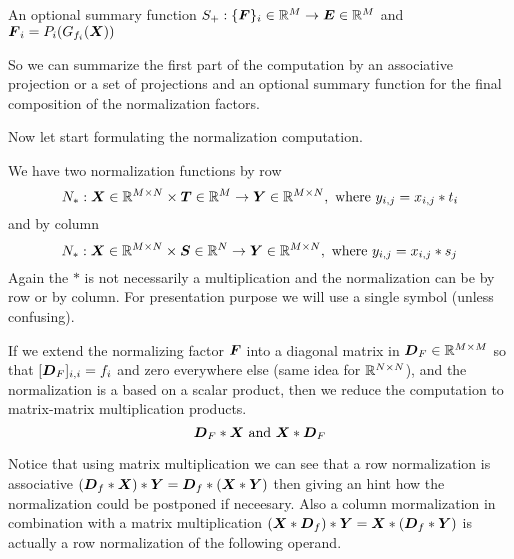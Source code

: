 \documentclass[acmsmall]{acmart}
\begin{document}
\begin{definition}
  An optional summary function $S_+: \{{\boldsymbol F}\}_i\in\mathbb{R}^{ M}
  \rightarrow {\boldsymbol E} \in \mathbb{R}^{M}$ and  ${\boldsymbol F}_i = P_i(G_{f_i}({\boldsymbol X}))$
\end{definition}
So we can summarize the first part of the computation by an
associative projection or a set of projections and an optional summary
function for the final composition of the normalization factors.

Now let start formulating the normalization computation.

\begin{definition}
  We have two normalization functions by row 
  \begin{equation}
    N_*: {\boldsymbol X}\in\mathbb{R}^{M\times N} \times {\boldsymbol T}\in \mathbb{R}^M \rightarrow {\boldsymbol Y}
    \in \mathbb{R}^{M\times N}, \text{ where } y_{i,j} = x_{i,j}*t_i
  \end{equation}
  and by column
  \begin{equation}
    N_*: {\boldsymbol X}\in\mathbb{R}^{M\times N} \times  {\boldsymbol S}\in \mathbb{R}^N \rightarrow {\boldsymbol Y}
    \in \mathbb{R}^{M\times N}, \text{ where } y_{i,j} = x_{i,j}*s_j
  \end{equation}
  Again the $*$ is not necessarily a multiplication and the
  normalization can be by row or by column. For presentation purpose
  we will use a single symbol (unless confusing).
\end{definition}

If we extend the normalizing factor ${\boldsymbol F}$ into a diagonal matrix in
${\boldsymbol D}_F \in \mathbb{R}^{M\times M}$ so that $[{\boldsymbol D}_F]_{i,i} = f_i$ and
zero everywhere else (same idea for $\mathbb{R}^{N\times N}$), and the
normalization is a based on a scalar product, then we reduce the
computation to matrix-matrix multiplication products. 
\begin{equation}
  {\boldsymbol D}_F * {\boldsymbol X} \text{ and } {\boldsymbol X} * {\boldsymbol D}_F
\end{equation}

Notice that using matrix multiplication we can see that a row
normalization is associative $({\boldsymbol D}_f * {\boldsymbol X}) * {\boldsymbol Y} = {\boldsymbol D}_f
* ({\boldsymbol X} * {\boldsymbol Y})$ then giving an hint how the normalization could
be postponed if neceesary.  Also a column mormalization in combination
with a matrix multiplication $({\boldsymbol X}* {\boldsymbol D}_f) * {\boldsymbol Y} = {\boldsymbol X}*
({\boldsymbol D}_f * {\boldsymbol Y})$ is actually a row normalization of the following
operand.
\end{document}
